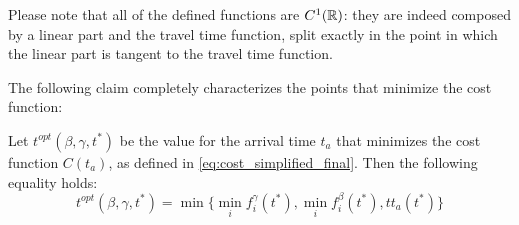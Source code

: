 Please note that all of the defined functions are \(C^1(\mathbb{R})\):
they are indeed composed by a linear part and the travel time function,
split exactly in the point in which the linear part is tangent to the travel time function.

The following claim completely characterizes the points that minimize the cost function:

\begin{theorem}
  Let \(t^{opt}(\beta, \gamma, t^*)\) be the value for the arrival time \(t_a\) that minimizes the cost function \(C(t_a)\), as defined in \eqref{eq:cost_simplified_final}.
  Then the following equality holds:
  \begin{equation}
    \label{eq:eq_theo}
    t^{opt}(\beta, \gamma, t^*) = \min\{\min_if_i^\gamma(t^*), \min_if_i^\beta(t^*), tt_a(t^*)\}
  \end{equation}
\end{theorem}

